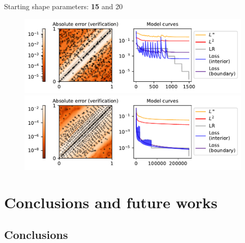 \documentclass[12pt]{report} %
\begin{document}
Starting shape parameters: \textbf{15} and 20

\begin{figure}
  \includegraphics[width=\textwidth]{imagenes/experiments/2d/hyperbolic_1d/hyperbolic_1d-TR60-C900-test-E1493.pdf}
  \includegraphics[width=\textwidth]{imagenes/experiments/2d/hyperbolic_1d/hyperbolic_1d-TR60-C900-test-E250590.pdf}
  
\end{figure}


\chapter{Conclusions and future works}

\section*{Conclusions}
\end{document}

